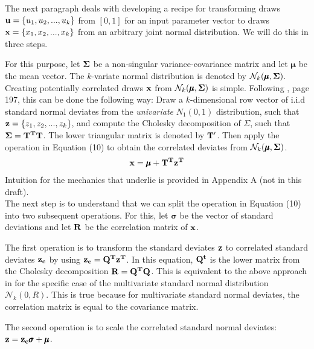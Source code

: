\documentclass[a4paper,12pt]{article}
\begin{document}
\noindent
The next paragraph deals with developing a recipe for transforming draws $\bold{u} = \{u_1, u_2, ..., u_k\}$ from $[0,1]$ for an input parameter vector to draws $\bold{x} = \{x_1, x_2, ..., x_k\}$ from an arbitrary joint normal distribution. We will do this in three steps. 

For this purpose, let $\bold{\Sigma}$ be a non-singular variance-covariance matrix and let $\pmb{\mu}$ be the mean vector. The $k$-variate normal distribution is denoted by $\mathcal{N}_k(\pmb{\mu}, \bold{\Sigma})$. \\

\noindent
Creating potentially correlated draws $\bold{x}$ from $\mathcal{N}_k(\pmb{\mu}, \bold{\Sigma})$ is simple. Following \cite{gentle2006random}, page 197, this can be done the following way: Draw a $k$-dimensional row vector of i.i.d standard normal deviates from the \textit{univariate} $N_1(0,1)$ distribution, such that  $\bold{z} = \{z_1, z_2, ..., z_k\}$, and compute the Cholesky decomposition of $\Sigma$, such that $\bold{\Sigma} = \bold{T^T T}$. The lower triangular matrix is denoted by $\bold{T'}$. Then apply the operation in Equation (10) to obtain the correlated deviates from $\mathcal{N}_k(\pmb{\mu}, \bold{\Sigma})$.
\begin{align}
\bold{x} = \pmb{\mu} + \bold{T^T z^T} 
\end{align}
Intuition for the mechanics  that underlie is provided in Appendix A (not in this draft). \\

\noindent
The next step is to understand that we can split the operation in Equation (10) into two subsequent operations. For this, let $\pmb{\sigma}$ be the vector of standard deviations and let $\bold{R}$ be the correlation matrix of $\bold{x}$.

The first operation is to transform the standard deviates $\bold{z}$ to correlated standard deviates $\bold{z_c}$ by using $\bold{z_c}=\bold{Q^T z^T}$. In this equation, $\bold{Q^t}$ is the lower matrix from the Cholesky decomposition $\bold{R}=\bold{Q^T Q}$. This is equivalent to the above approach in \cite{gentle2006random} for the specific case of the multivariate standard normal distribution $\mathcal{N}_k(0, R)$. This is true because for multivariate standard normal deviates, the correlation matrix is equal to the covariance matrix.

The second operation is to scale the correlated standard normal deviates: $\bold{z}=\bold{z_c}\pmb{\sigma} + \pmb{\mu}$.\\
\end{document}
